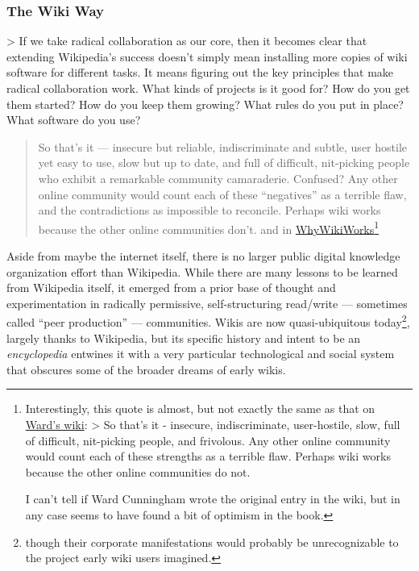 \documentclass[10pt]{article}
\begin{document}
\hypertarget{the-wiki-way}{%
\subsubsection{The Wiki Way}\label{the-wiki-way}}


\begin{multicols}{2}
 \textgreater{} If we take radical collaboration as our
core, then it becomes clear that extending Wikipedia's success doesn't
simply mean installing more copies of wiki software for different tasks.
It means figuring out the key principles that make radical collaboration
work. What kinds of projects is it good for? How do you get them
started? How do you keep them growing? What rules do you put in place?
What software do you use? \cite{swartzMakingMoreWikipedias2006} 

\begin{quote}
So that's it --- insecure but reliable, indiscriminate and subtle, user
hostile yet easy to use, slow but up to date, and full of difficult,
nit-picking people who exhibit a remarkable community camaraderie.
Confused? Any other online community would count each of these
``negatives'' as a terrible flaw, and the contradictions as impossible
to reconcile. Perhaps wiki works because the other online communities
don't. \cite{leufWikiWayQuick2001a}  and in
\href{http://wiki.c2.com/?WhyWikiWorks}{WhyWikiWorks}\footnote{Interestingly,
  this quote is almost, but not exactly the same as that on
  \href{http://wiki.c2.com/?WhyWikiWorks}{Ward's wiki}: \textgreater{}
  So that's it - insecure, indiscriminate, user-hostile, slow, full of
  difficult, nit-picking people, and frivolous. Any other online
  community would count each of these strengths as a terrible flaw.
  Perhaps wiki works because the other online communities do not.

  I can't tell if Ward Cunningham wrote the original entry in the wiki,
  but in any case seems to have found a bit of optimism in the book.}
\end{quote}

Aside from maybe the internet itself, there is no larger public digital
knowledge organization effort than Wikipedia. While there are many
lessons to be learned from Wikipedia itself, it emerged from a prior
base of thought and experimentation in radically permissive,
self-structuring read/write --- sometimes called ``peer production''
\cite{hillWikipediaEndOpen2019}  --- communities. Wikis are now
quasi-ubiquitous today\footnote{though their corporate manifestations
  would probably be unrecognizable to the project early wiki users
  imagined.}, largely thanks to Wikipedia, but its specific history and
intent to be an \emph{encyclopedia} entwines it with a very particular
technological and social system that obscures some of the broader dreams
of early wikis.


\end{multicols}
\end{document}
